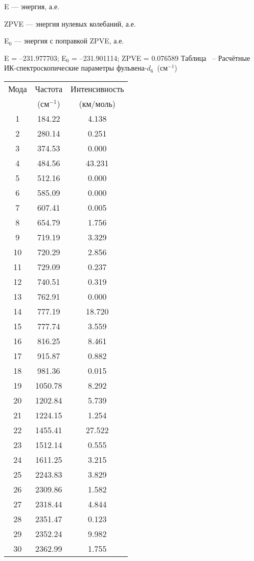 {E --- энергия, а.е.

ZPVE --- энергия нулевых колебаний, а.е.

E$_0$ --- энергия с поправкой ZPVE, а.е.

E =  --231.977703;    E$_0$ =  --231.901114; ZPVE = 0.076589
\newpage
Таблица \thet\, -- Расчётные ИК-спектроскопические параметры фульвена-$d_6$~(см$^{-1}$)
 \begin{center}
\begin{tabular}{ccc}
Мода & Частота   & Интенсивность \\
&(см$^{-1}$)&(км/моль)\\
\hline
   1 &  184.22 &     4.138 \\
    2 & 280.14 &     0.251    \\
    3 &  374.53 &    0.000    \\
    4 &  484.56 &   43.231   \\
    5 &  512.16 &    0.000    \\
    6 &  585.09 &   0.000    \\
    7 &  607.41 &   0.005    \\
    8 &  654.79 &    1.756    \\
    9 &  719.19 &    3.329    \\
   10 &  720.29 &    2.856    \\
   11 &  729.09 &    0.237    \\
   12 &  740.51 &    0.319    \\
   13 &  762.91 &    0.000    \\
   14 &  777.19 &   18.720    \\
   15 &  777.74 &    3.559    \\
   16 &  816.25 &    8.461    \\
   17 &  915.87 &    0.882    \\
   18 &  981.36 &   0.015    \\
   19 & 1050.78 &    8.292    \\
   20 & 1202.84 &    5.739    \\
   21 & 1224.15 &    1.254    \\
   22 & 1455.41 &   27.522    \\
   23 & 1512.14 &    0.555    \\
   24 & 1611.25 &  3.215    \\
   25 & 2243.83 &    3.829    \\
   26 & 2309.86 &    1.582    \\
   27 & 2318.44 &    4.844    \\
   28 & 2351.47 &    0.123    \\
   29 & 2352.24 &    9.982    \\
   30 & 2362.99 &    1.755    \\


\end{tabular}
\end{center}}
